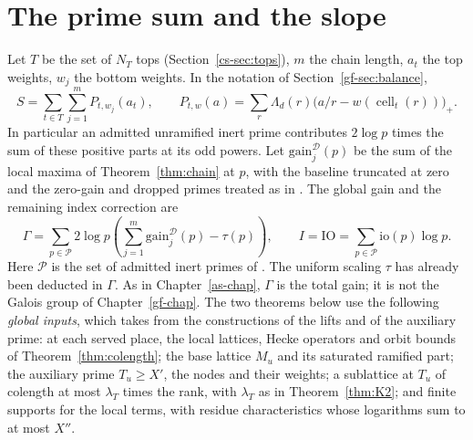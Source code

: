 \documentclass[reqno]{amsart}
\newcounter{chap}
\theoremstyle{definition}
\theoremstyle{plain}
\newcommand{\io}{\mathrm{io}}
\newcommand{\IO}{\mathrm{IO}}
\begin{document}
\section{The prime sum and the slope}\label{sec:global}
Let \(T\) be the set of \(N_T\) tops (Section~\ref{cs-sec:tops}), \(m\) the chain length, \(a_t\) the top weights, \(w_j\) the bottom weights. In the notation of Section~\ref{gf-sec:balance},
\[
 S=\sum_{t\in T}\sum_{j=1}^m P_{t,w_j}(a_t),\qquad
 P_{t,w}(a)=\sum_r\Lambda_d(r)\big(a/r-w(\operatorname{cell}_t(r))\big)_+ .
\]
In particular an admitted unramified inert prime contributes \(2\log p\) times the sum of these positive parts at its odd powers. Let \(\mathrm{gain}^{\mathcal D}_j(p)\) be the sum of the local maxima of Theorem~\ref{thm:chain} at \(p\), with the baseline truncated at zero and the zero-gain and dropped primes treated as in \cite[Def.~12.3 and \S12.1]{Adr}. The global gain and the remaining index correction are
\[
 \Gamma=\sum_{p\in\mathcal P}2\log p\left(\sum_{j=1}^m\mathrm{gain}^{\mathcal D}_j(p)-\tau(p)\right),
 \qquad I=\IO=\sum_{p\in\mathcal P}\io(p)\log p .
\]
Here \(\mathcal P\) is the set of admitted inert primes of \cite[\S12.1]{Adr}. The uniform scaling \(\tau\) has already been deducted in \(\Gamma\).  As in Chapter~\ref{as-chap}, \(\Gamma\) is the total gain; it is not the Galois group of Chapter~\ref{gf-chap}.  The two theorems below use the following \emph{global inputs}, which \cite[\S12.6, (L1)--(L8)]{Adr} takes from the constructions of the lifts and of the auxiliary prime: at each served place, the local lattices, Hecke operators and orbit bounds of Theorem~\ref{thm:colength}; the base lattice \(M_u\) and its saturated ramified part; the auxiliary prime \(T_u\ge X'\), the nodes and their weights; a sublattice at \(T_u\) of colength at most \(\lambda_T\) times the rank, with \(\lambda_T\) as in Theorem~\ref{thm:K2}; and finite supports for the local terms, with residue characteristics whose logarithms sum to at most \(X''\).
\end{document}
